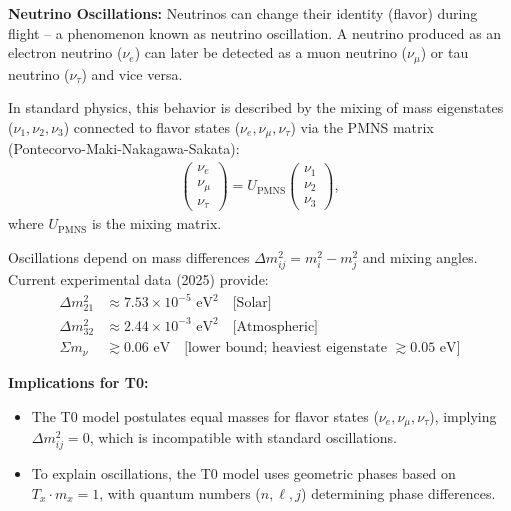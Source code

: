 	\begin{important}
		\textbf{Neutrino Oscillations:} Neutrinos can change their identity (flavor) during flight -- a phenomenon known as neutrino oscillation. A neutrino produced as an electron neutrino (\(\nu_e\)) can later be detected as a muon neutrino (\(\nu_\mu\)) or tau neutrino (\(\nu_\tau\)) and vice versa.
		
		In standard physics, this behavior is described by the mixing of mass eigenstates (\(\nu_1, \nu_2, \nu_3\)) connected to flavor states (\(\nu_e, \nu_\mu, \nu_\tau\)) via the PMNS matrix (Pontecorvo-Maki-Nakagawa-Sakata):
		\begin{align}
			\begin{pmatrix}
				\nu_e \\ \nu_\mu \\ \nu_\tau
			\end{pmatrix}
			=
			U_{\text{PMNS}}
			\begin{pmatrix}
				\nu_1 \\ \nu_2 \\ \nu_3
			\end{pmatrix},
		\end{align}
		where \(U_{\text{PMNS}}\) is the mixing matrix.
		
		Oscillations depend on mass differences \(\Delta m^2_{ij} = m_i^2 - m_j^2\) and mixing angles. Current experimental data (2025) provide:
		\begin{align}
			\Delta m^2_{21} &\approx 7.53 \times 10^{-5} \text{ eV}^2 \quad \text{[Solar]} \\
			\Delta m^2_{32} &\approx 2.44 \times 10^{-3} \text{ eV}^2 \quad \text{[Atmospheric]} \\
			\Sigma m_\nu &\gtrsim 0.06 \text{ eV} \quad \text{[lower bound; heaviest eigenstate } \gtrsim 0.05\text{ eV]}
		\end{align}

		\textbf{Implications for T0:}
		\begin{itemize}
			\item The T0 model postulates equal masses for flavor states (\(\nu_e, \nu_\mu, \nu_\tau\)), implying \(\Delta m^2_{ij} = 0\), which is incompatible with standard oscillations.
			\item To explain oscillations, the T0 model uses geometric phases based on \( T_x \cdot m_x = 1 \), with quantum numbers (\(n, \ell, j\)) determining phase differences.
		\end{itemize}
	\end{important}
	
